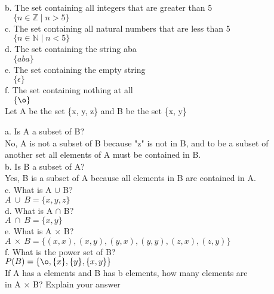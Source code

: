 \documentclass[12pt]{article}
\begin{document}
b. The set containing all integers that are greater than 5 \\
\indent
$ \quad \{n \in \mathbb{Z} \mid n > 5\} $ \\

c. The set containing all natural numbers that are less than 5 \\
\indent
$ \quad \{n \in \mathbb{N} \mid n < 5\} $ \\

d. The set containing the string aba \\
\indent
$ \quad \{aba\} $ \\

e. The set containing the empty string \\
\indent
$ \quad \{\epsilon\} $ \\

f. The set containing nothing at all \\
\indent
$ \quad \{\o\} $ \\

 \quad Let A be the set \{x, y, z\} and B be the set \{x, y\}

a. Is A a subset of B? \\
\indent
No, A is not a subset of B because "z" is not in B, and to be a subset of \\
\indent
another set all elements of A must be contained in B. \\

b. Is B a subset of A? \\
\indent
Yes, B is a subset of A because all elements in B are contained in A. \\

c. What is A $\cup$ B? \\
\indent
$ A \ \cup \ B = \{x,y,z\} $ \\

d. What is A $\cap$ B? \\
\indent
$ A \ \cap \ B = \{x,y\} $ \\

e. What is A $\times$ B? \\
\indent
$ A \ \times \ B = \{(x,x),(x,y),(y,x),(y,y),(z,x),(z,y)\} $ \\

f. What is the power set of B? \\
\indent
$ P(B) = \{\o, \{x\}, \{y\}, \{x, y\}\} $ \\

 \quad If A has a elements and B has b elements, how many elements are \\
\indent
\quad in A $\times$ B? Explain your answer \\
\end{document}
